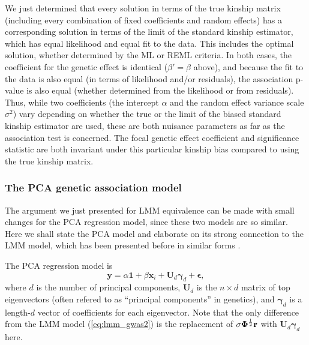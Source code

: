 \documentclass[11pt]{article}
\newcommand{\kinMat}{%
  \ensuremath{%
    \mathbf{\Phi}
  }%
  \xspace%
}%
\begin{document}
We just determined that every solution in terms of the true kinship matrix (including every combination of fixed coefficients and random effects) has a corresponding solution in terms of the limit of the standard kinship estimator, which has equal likelihood and equal fit to the data.
This includes the optimal solution, whether determined by the ML or REML criteria.
In both cases, the coefficient for the genetic effect is identical ($\beta' = \beta$ above), and because the fit to the data is also equal (in terms of likelihood and/or residuals), the association p-value is also equal (whether determined from the likelihood or from residuals).
Thus, while two coefficients (the intercept $\alpha$ and the random effect variance scale $\sigma^2$) vary depending on whether the true or the limit of the biased standard kinship estimator are used, these are both nuisance parameters as far as the association test is concerned.
The focal genetic effect coefficient and significance statistic are both invariant under this particular kinship bias compared to using the true kinship matrix.

\subsubsection{The PCA genetic association model}

The argument we just presented for LMM equivalence can be made with small changes for the PCA regression model, since these two models are so similar.
Here we shall state the PCA model and elaborate on its strong connection to the LMM model, which has been presented before in similar forms \citep{astle_population_2009, hoffman_correcting_2013}.

The PCA regression model is
\begin{equation}
  \label{eq:pca_gwas}
  \mathbf{y}
  =
  \alpha \mathbf{1} + \beta \mathbf{x}_i + \mathbf{U}_d \boldsymbol{\gamma}_d + \boldsymbol{\epsilon}
  ,
\end{equation}
where
$d$ is the number of principal components,
$\mathbf{U}_d$ is the $n \times d$ matrix of top eigenvectors (often refered to as ``principal components'' in genetics),
and $\boldsymbol{\gamma}_d$ is a length-$d$ vector of coefficients for each eigenvector.
Note that the only difference from the LMM model (\cref{eq:lmm_gwas2}) is the replacement of $\sigma \kinMat^\frac{1}{2} \mathbf{r}$ with $\mathbf{U}_d \boldsymbol{\gamma}_d$ here.
\end{document}
